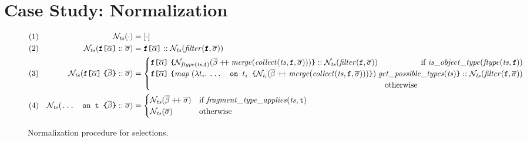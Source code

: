 \section{Case Study: Normalization}\label{sec:norm}

\begin{figure*}[t]
  \small
  \begin{flushright}
  \end{flushright}  
  \centering
  \vspace{-1ex}
    \begin{align*}
    & (1) & \tnorm{\cdot} &= [\cdot] \\
    & (2) & \tnorm{\fld :: \sset} &= 
       	\fld :: \tnorm{\filter{\sset}{\fkey}} \\      
    & (3) & \tnorm{\nfld{\overline{\beta}} :: \sset} &=
    \begin{cases}
        \nfld{\norm{\mathit{\ftype{ts}{\fkey}}}{\overline{\beta} \mdoubleplus \mathit{merge (\collect{ts}{\fkey}{\sset})}}} :: \tnorm{\filter{\sset}{\fkey}} \hfill \text{ if } 
	            \mathit{is\_object\_type (\ftype{ts}{\fkey})}\\
    \nfld{\mathit{map}\; (\lambda t_{i}.\; \ifrag{$t_{i}$}{\norm{t_{i}}{\overline{\beta} \mdoubleplus \mathit{merge (\collect{ts}{\fkey}{\sset})}}})\; \mathit{get\_possible\_types (ts)}} 
    		:: \tnorm{\filter{\sset}{\fkey}} \\
		\quad\quad\quad\quad\quad\quad\quad\quad\quad\quad\quad\quad\quad\quad\quad\quad\quad\quad\quad\quad\quad\quad\quad\quad\quad\quad\quad\quad\quad\; \text{ otherwise } 
    \end{cases}\\
    & (4) & \tnorm{\ifrag{t}{\overline{\beta}} :: \sset} &= 
    \begin{cases}
    \tnorm{\overline{\beta} \mdoubleplus \sset} & 
    \text{if }\mathit{fragment\_type\_applies(ts, \texttt{t})}\\
    \tnorm{\sset} & \text{otherwise}
    \end{cases}
    \end{align*}
    \caption{Normalization procedure for \gql selections. 
    }
\label{fig:normalize}
\end{figure*}

